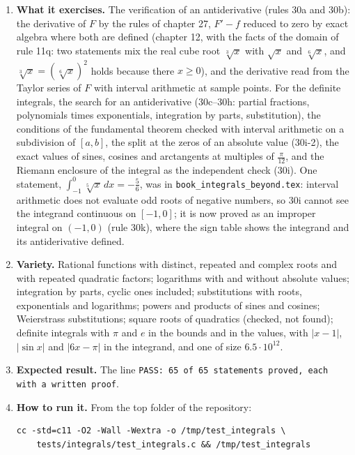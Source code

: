 \documentclass[11pt,a4paper]{article}
\begin{document}
\begin{enumerate}
\item \textbf{What it exercises.} The verification of an antiderivative (rules 30a and 30b): the derivative of $F$ by the rules of chapter 27, $F' - f$ reduced to zero by exact algebra where both are defined (chapter 12, with the facts of the domain of rule 11q: two statements mix the real cube root $\sqrt[3]{x}$ with $\sqrt{x}$ and $\sqrt[6]{x}$, and $\sqrt[3]{x} = (\sqrt[6]{x})^{2}$ holds because there $x \ge 0$), and the derivative read from the Taylor series of $F$ with interval arithmetic at sample points. For the definite integrals, the search for an antiderivative (30c--30h: partial fractions, polynomials times exponentials, integration by parts, substitution), the conditions of the fundamental theorem checked with interval arithmetic on a subdivision of $[a, b]$, the split at the zeros of an absolute value (30i-2), the exact values of sines, cosines and arctangents at multiples of $\frac{\pi}{12}$, and the Riemann enclosure of the integral as the independent check (30i). One statement, $\int_{-1}^{0} \sqrt[5]{x} \, dx = -\frac{5}{6}$, was in \texttt{book\_integrals\_beyond.tex}: interval arithmetic does not evaluate odd roots of negative numbers, so 30i cannot see the integrand continuous on $[-1, 0]$; it is now proved as an improper integral on $(-1, 0)$ (rule 30k), where the sign table shows the integrand and its antiderivative defined.

\item \textbf{Variety.} Rational functions with distinct, repeated and complex roots and with repeated quadratic factors; logarithms with and without absolute values; integration by parts, cyclic ones included; substitutions with roots, exponentials and logarithms; powers and products of sines and cosines; Weierstrass substitutions; square roots of quadratics (checked, not found); definite integrals with $\pi$ and $e$ in the bounds and in the values, with $|x - 1|$, $|\sin x|$ and $|6x - \pi|$ in the integrand, and one of size $6.5 \cdot 10^{12}$.

\item \textbf{Expected result.} The line \texttt{PASS: 65 of 65 statements proved, each with a written proof}.

\item \textbf{How to run it.} From the top folder of the repository:
\begin{verbatim}
cc -std=c11 -O2 -Wall -Wextra -o /tmp/test_integrals \
    tests/integrals/test_integrals.c && /tmp/test_integrals
\end{verbatim}
\end{enumerate}
\end{document}
